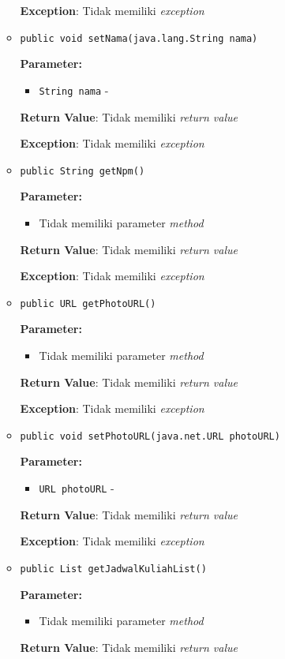 \documentclass{article}
\begin{document}
\begin{enumerate}
\begin{itemize}
\textbf{Exception}: Tidak memiliki \textit{exception}

\item \texttt{public void setNama(java.lang.String nama)}



\textbf{Parameter:}
\begin{itemize}
\item \texttt{String nama} - 
\end{itemize}
\textbf{Return Value}: Tidak memiliki \textit{return value}

\textbf{Exception}: Tidak memiliki \textit{exception}

\item \texttt{public String getNpm()}



\textbf{Parameter:}
\begin{itemize}
\item Tidak memiliki parameter \textit{method}
\end{itemize}
\textbf{Return Value}: Tidak memiliki \textit{return value}

\textbf{Exception}: Tidak memiliki \textit{exception}

\item \texttt{public URL getPhotoURL()}



\textbf{Parameter:}
\begin{itemize}
\item Tidak memiliki parameter \textit{method}
\end{itemize}
\textbf{Return Value}: Tidak memiliki \textit{return value}

\textbf{Exception}: Tidak memiliki \textit{exception}

\item \texttt{public void setPhotoURL(java.net.URL photoURL)}



\textbf{Parameter:}
\begin{itemize}
\item \texttt{URL photoURL} - 
\end{itemize}
\textbf{Return Value}: Tidak memiliki \textit{return value}

\textbf{Exception}: Tidak memiliki \textit{exception}

\item \texttt{public List getJadwalKuliahList()}



\textbf{Parameter:}
\begin{itemize}
\item Tidak memiliki parameter \textit{method}
\end{itemize}
\textbf{Return Value}: Tidak memiliki \textit{return value}


\end{itemize}
\end{enumerate}
\end{document}

